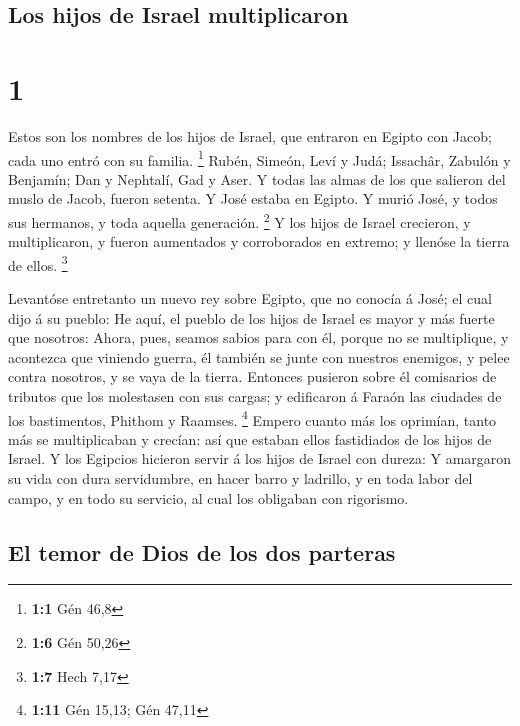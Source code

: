 \hypertarget{los-hijos-de-israel-multiplicaron}{%
\subsection{Los hijos de Israel
multiplicaron}\label{los-hijos-de-israel-multiplicaron}}

\hypertarget{section}{%
\section{1}\label{section}}

 Estos son los nombres de los hijos de Israel, que entraron
en Egipto con Jacob; cada uno entró con su familia. \footnote{\textbf{1:1}
  Gén 46,8}  Rubén, Simeón, Leví y Judá; 
Issachâr, Zabulón y Benjamín;  Dan y Nephtalí, Gad y Aser.
 Y todas las almas de los que salieron del muslo de Jacob,
fueron setenta. Y José estaba en Egipto.  Y murió José, y
todos sus hermanos, y toda aquella generación. \footnote{\textbf{1:6}
  Gén 50,26}  Y los hijos de Israel crecieron, y
multiplicaron, y fueron aumentados y corroborados en extremo; y llenóse
la tierra de ellos. \footnote{\textbf{1:7} Hech 7,17}

 Levantóse entretanto un nuevo rey sobre Egipto, que no
conocía á José; el cual dijo á su pueblo:  He aquí, el
pueblo de los hijos de Israel es mayor y más fuerte que nosotros:
 Ahora, pues, seamos sabios para con él, porque no se
multiplique, y acontezca que viniendo guerra, él también se junte con
nuestros enemigos, y pelee contra nosotros, y se vaya de la tierra.
 Entonces pusieron sobre él comisarios de tributos que los
molestasen con sus cargas; y edificaron á Faraón las ciudades de los
bastimentos, Phithom y Raamses. \footnote{\textbf{1:11} Gén 15,13; Gén
  47,11}  Empero cuanto más los oprimían, tanto más se
multiplicaban y crecían: así que estaban ellos fastidiados de los hijos
de Israel.  Y los Egipcios hicieron servir á los hijos de
Israel con dureza:  Y amargaron su vida con dura
servidumbre, en hacer barro y ladrillo, y en toda labor del campo, y en
todo su servicio, al cual los obligaban con rigorismo.

\hypertarget{el-temor-de-dios-de-los-dos-parteras}{%
\subsection{El temor de Dios de los dos
parteras}\label{el-temor-de-dios-de-los-dos-parteras}}

